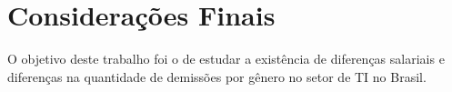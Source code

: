 \section{Considerações Finais}

O objetivo deste trabalho foi o de estudar a existência de diferenças salariais e diferenças na quantidade de demissões por gênero no setor de TI no Brasil.
